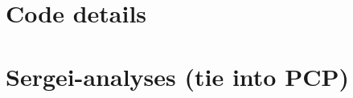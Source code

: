 \chapter*{Code details}
\label{App:Code}
\chapter*{Sergei-analyses (tie into PCP)}
\label{sec:Sergei}

